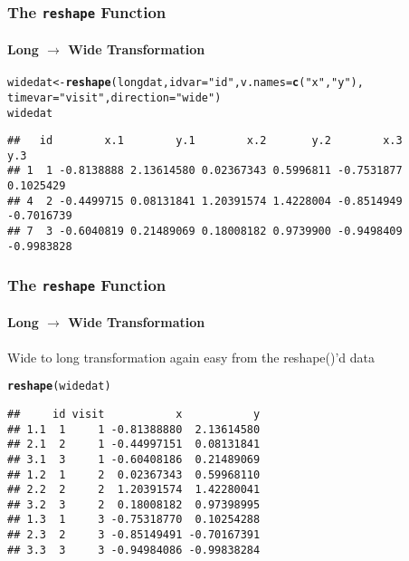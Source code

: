 \documentclass[paper=screen,mathserif]{beamer}\usepackage[]{graphicx}\usepackage[]{color}
\makeatletter
\newcommand{\hlstr}[1]{\textcolor[rgb]{0.192,0.494,0.8}{#1}}%
\newcommand{\hlstd}[1]{\textcolor[rgb]{0.345,0.345,0.345}{#1}}%
\newcommand{\hlkwb}[1]{\textcolor[rgb]{0.69,0.353,0.396}{#1}}%
\newcommand{\hlkwc}[1]{\textcolor[rgb]{0.333,0.667,0.333}{#1}}%
\newcommand{\hlkwd}[1]{\textcolor[rgb]{0.737,0.353,0.396}{\textbf{#1}}}%
\newenvironment{kframe}{%
 \def\at@end@of@kframe{}%
 \ifinner\ifhmode%
  \def\at@end@of@kframe{\end{minipage}}%
  \begin{minipage}{\columnwidth}%
 \fi\fi%
 \def\FrameCommand##1{\hskip\@totalleftmargin \hskip-\fboxsep
 \colorbox{shadecolor}{##1}\hskip-\fboxsep
     \hskip-\linewidth \hskip-\@totalleftmargin \hskip\columnwidth}%
 \MakeFramed {\advance\hsize-\width
   \@totalleftmargin\z@ \linewidth\hsize
   \@setminipage}}%
 {\par\unskip\endMakeFramed%
 \at@end@of@kframe}
\newenvironment{knitrout}{}{} %
\newcommand{\ft}[1]{\frametitle{#1}}
\newcommand{\fst}[1]{\framesubtitle{#1}}
\makeatother
\begin{document}
\begin{frame}[fragile]
  \ft{The {\tt reshape} Function}
  \fst{Long $\rightarrow$ Wide Transformation}
  
\begin{knitrout}\scriptsize
{}\color{fgcolor}\begin{kframe}
\begin{alltt}
\hlstd{widedat} \hlkwb{<-} \hlkwd{reshape}\hlstd{(longdat,} \hlkwc{idvar} \hlstd{=} \hlstr{"id"}\hlstd{,} \hlkwc{v.names} \hlstd{=} \hlkwd{c}\hlstd{(}\hlstr{"x"}\hlstd{,} \hlstr{"y"}\hlstd{),}
                   \hlkwc{timevar} \hlstd{=} \hlstr{"visit"}\hlstd{,} \hlkwc{direction} \hlstd{=} \hlstr{"wide"}\hlstd{)}
\hlstd{widedat}
\end{alltt}
\begin{verbatim}
##   id        x.1        y.1        x.2       y.2        x.3        y.3
## 1  1 -0.8138888 2.13614580 0.02367343 0.5996811 -0.7531877  0.1025429
## 4  2 -0.4499715 0.08131841 1.20391574 1.4228004 -0.8514949 -0.7016739
## 7  3 -0.6040819 0.21489069 0.18008182 0.9739900 -0.9498409 -0.9983828
\end{verbatim}
\end{kframe}
\end{knitrout}
\end{frame}

\begin{frame}[fragile]
  \ft{The {\tt reshape} Function}
  \fst{Long $\rightarrow$ Wide Transformation}

  Wide to long transformation again easy from the reshape()'d data
\begin{knitrout}\scriptsize
{}\color{fgcolor}\begin{kframe}
\begin{alltt}
\hlkwd{reshape}\hlstd{(widedat)}
\end{alltt}
\begin{verbatim}
##     id visit           x           y
## 1.1  1     1 -0.81388880  2.13614580
## 2.1  2     1 -0.44997151  0.08131841
## 3.1  3     1 -0.60408186  0.21489069
## 1.2  1     2  0.02367343  0.59968110
## 2.2  2     2  1.20391574  1.42280041
## 3.2  3     2  0.18008182  0.97398995
## 1.3  1     3 -0.75318770  0.10254288
## 2.3  2     3 -0.85149491 -0.70167391
## 3.3  3     3 -0.94984086 -0.99838284
\end{verbatim}
\end{kframe}
\end{knitrout}

\end{frame}
\end{document}
